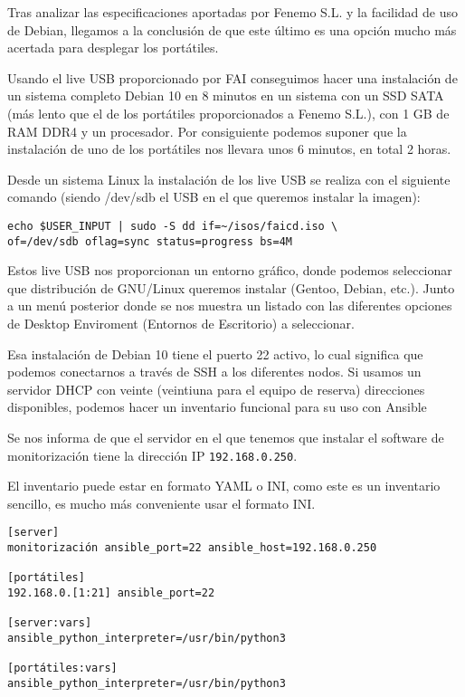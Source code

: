 \documentclass[11pt]{article}
\begin{document}
Tras analizar las especificaciones aportadas por Fenemo S.L. y la facilidad de uso de Debian, llegamos a la conclusión de que este último es una opción mucho más acertada para desplegar los portátiles.

Usando el live USB proporcionado por FAI conseguimos hacer una instalación de un sistema completo Debian 10 en 8 minutos en un sistema con un SSD SATA (más lento que el de los portátiles proporcionados a Fenemo S.L.), con 1 GB de RAM DDR4 y un procesador. Por consiguiente podemos suponer que la instalación de uno de los portátiles nos llevara unos 6 minutos, en total 2 horas.

Desde un sistema Linux la instalación de los live USB se realiza con el siguiente comando (siendo /dev/sdb el USB en el que queremos instalar la imagen):

\begin{verbatim}
echo $USER_INPUT | sudo -S dd if=~/isos/faicd.iso \
of=/dev/sdb oflag=sync status=progress bs=4M
\end{verbatim}

Estos live USB nos proporcionan un entorno gráfico, donde podemos seleccionar que distribución de GNU/Linux queremos instalar (Gentoo, Debian, etc.). Junto a un menú posterior donde se nos muestra un listado con las diferentes opciones de Desktop Enviroment (Entornos de Escritorio) \cite{archde2020} a seleccionar.

Esa instalación de Debian 10 tiene el puerto 22 activo, lo cual significa que podemos conectarnos a través de SSH a los diferentes nodos. Si usamos un servidor DHCP con veinte (veintiuna para el equipo de reserva) direcciones disponibles, podemos hacer un inventario funcional para su uso con Ansible\cite[pp. 45-53]{ansi2020}

Se nos informa de que el servidor en el que tenemos que instalar el software de monitorización tiene la dirección IP \texttt{192.168.0.250}.

El inventario puede estar en formato YAML o INI, como este es un inventario sencillo, es mucho más conveniente usar el formato INI.

\begin{verbatim}
[server]
monitorización ansible_port=22 ansible_host=192.168.0.250

[portátiles]
192.168.0.[1:21] ansible_port=22

[server:vars]
ansible_python_interpreter=/usr/bin/python3

[portátiles:vars]
ansible_python_interpreter=/usr/bin/python3
\end{verbatim}
\end{document}
